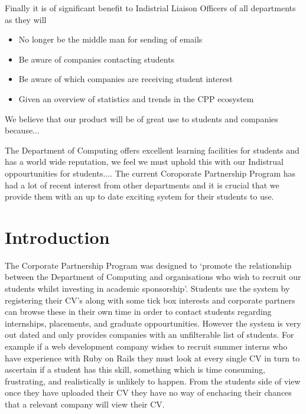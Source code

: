 \documentclass{article}
\begin{document}
Finally it is of significant benefit to Indistrial Liaison Officers of all departments as they will

\begin{itemize}
  \item No longer be the middle man for sending of emails
  \item Be aware of companies contacting students
  \item Be aware of which companies are receiving student interest
  \item Given an overview of statistics and trends in the CPP ecosystem
\end{itemize}

We believe that our product will be of great use to students and companies because...

The Department of Computing offers excellent learning facilities for students and has a world wide reputation, we feel we must uphold this with our Indistrual oppourtunities for students....
The current Coroporate Partnership Program has had a lot of recent interest from other departments and it is crucial that we provide them with an up to date exciting system for their students to use.




\pagebreak
\section{Introduction}
The Corporate Partnership Program was designed to `promote the relationship between the Department of Computing and organisations who wish to recruit our students whilst investing in academic sponsorship'.
Students use the system by registering their CV's along with some tick box interests and corporate partners can browse these in their own time in order to contact students regarding internships, placements, and graduate oppourtunities.
However the system is very out dated and only provides companies with an unfilterable list of students. For example if a web development company wishes to recruit summer interns who have experience with Ruby on Rails they must look at every single CV in turn to ascertain if a student has this skill, something which is time consuming, frustrating, and realistically is unlikely to happen.
From the students side of view once they have uploaded their CV they have no way of enchacing their chances that a relevant company will view their CV.
\end{document}
